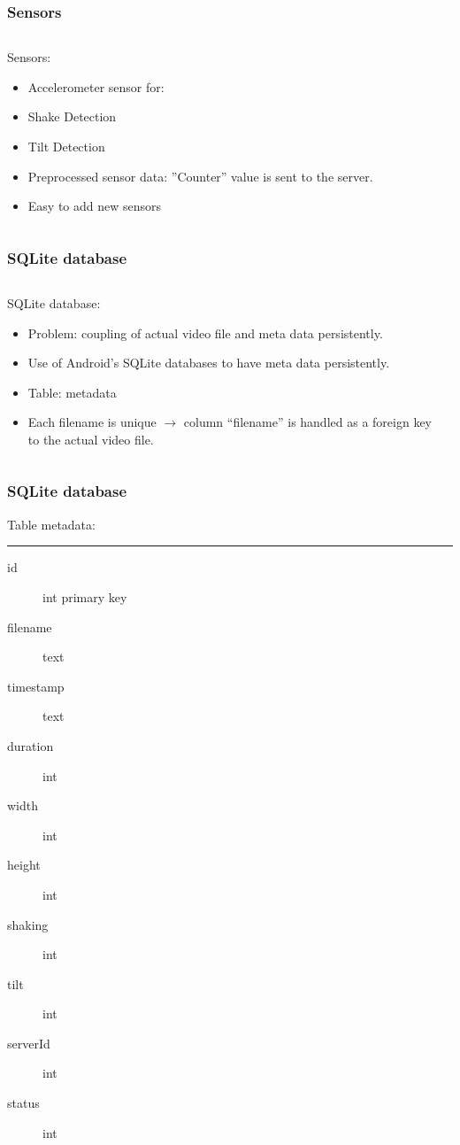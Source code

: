 \begin{frame}	
	\frametitle{Sensors}
	\begin{columns}[t]
		\begin{column}[t]{0.5\linewidth}
			Sensors:
			\begin{itemize}
				\item Accelerometer sensor for:
				\item Shake Detection
				\item Tilt Detection
				\item Preprocessed sensor data: ”Counter” value is sent to the server.
				\item Easy to add new sensors
			\end{itemize}
		\end{column}
		\begin{column}[t]{0.5\linewidth}
			
		\end{column}				
	\end{columns}	
\end{frame}

\begin{frame}	
	\frametitle{SQLite database}
	\begin{columns}[t]
		\begin{column}[t]{0.5\linewidth}
			SQLite database:
				\begin{itemize}
					\item Problem: coupling of actual video file and meta data persistently. 
					\item Use of Android's SQLite databases to have meta data persistently.
					\item Table: metadata
					\item Each filename is unique $\rightarrow$ column ``filename'' is handled as a foreign key to the actual video file.
				\end{itemize}
		\end{column}
		\begin{column}[t]{0.5\linewidth}
			
		\end{column}
	\end{columns}		
\end{frame}

\begin{frame}	
	\frametitle{SQLite database}
		Table metadata: \hrule
		\begin{description}	
			\item[id] int primary key
			\item[filename] text
			\item[timestamp] text
			\item[duration] int
			\item[width] int
			\item[height] int
			\item[shaking] int
			\item[tilt] int
			\item[serverId] int
			\item[status] int
		\end{description}
\end{frame}

